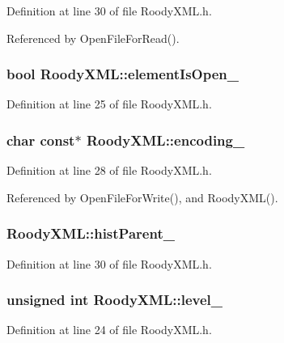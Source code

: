Definition at line 30 of file RoodyXML.h.



Referenced by OpenFileForRead().

\subsubsection[{elementIsOpen\_\-}]{\setlength{\rightskip}{0pt plus 5cm}bool {\bf RoodyXML::elementIsOpen\_\-}}\label{classRoodyXML_afd6670c3ae32efb72c22ecbbed426223}


Definition at line 25 of file RoodyXML.h.

\subsubsection[{encoding\_\-}]{\setlength{\rightskip}{0pt plus 5cm}char const$\ast$ {\bf RoodyXML::encoding\_\-}}\label{classRoodyXML_abede48f12f63082bbbbeef3f09d67952}


Definition at line 28 of file RoodyXML.h.



Referenced by OpenFileForWrite(), and RoodyXML().

\subsubsection[{histParent\_\-}]{ {\bf RoodyXML::histParent\_\-}}\label{classRoodyXML_ad46975b1ad12c75a53c771e0f6caeff0}


Definition at line 30 of file RoodyXML.h.

\subsubsection[{level\_\-}]{\setlength{\rightskip}{0pt plus 5cm}unsigned int {\bf RoodyXML::level\_\-}}\label{classRoodyXML_a0fb9f479a4f734f5180998eca8bfdc09}


Definition at line 24 of file RoodyXML.h.

